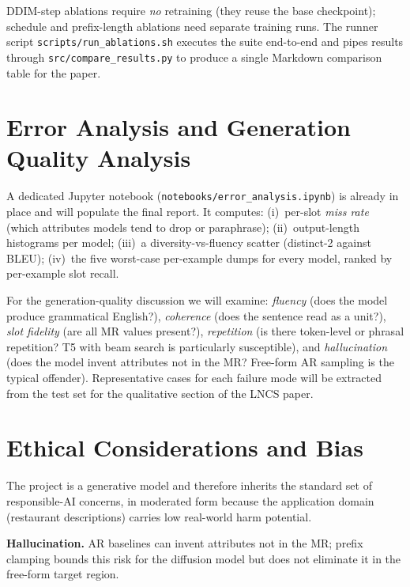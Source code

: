 \documentclass[11pt,a4paper]{article}
\begin{document}
DDIM-step ablations require \emph{no} retraining (they reuse the base
checkpoint); schedule and prefix-length ablations need separate training
runs. The runner script \texttt{scripts/run\_ablations.sh} executes the suite
end-to-end and pipes results through \texttt{src/compare\_results.py} to
produce a single Markdown comparison table for the paper.

\section{Error Analysis and Generation Quality Analysis}

A dedicated Jupyter notebook (\texttt{notebooks/error\_analysis.ipynb}) is
already in place and will populate the final report. It computes:
(i)~per-slot \emph{miss rate} (which attributes models tend to drop or
paraphrase); (ii)~output-length histograms per model; (iii)~a
diversity-vs-fluency scatter (distinct-2 against BLEU); (iv)~the five
worst-case per-example dumps for every model, ranked by per-example slot
recall.

For the generation-quality discussion we will examine: \emph{fluency} (does
the model produce grammatical English?), \emph{coherence} (does the
sentence read as a unit?), \emph{slot fidelity} (are all MR values
present?), \emph{repetition} (is there token-level or phrasal repetition?
T5 with beam search is particularly susceptible), and \emph{hallucination}
(does the model invent attributes not in the MR? Free-form AR sampling is
the typical offender). Representative cases for each failure mode will be
extracted from the test set for the qualitative section of the LNCS paper.

\section{Ethical Considerations and Bias}

The project is a generative model and therefore inherits the standard set of
responsible-AI concerns, in moderated form because the application domain
(restaurant descriptions) carries low real-world harm potential.

\textbf{Hallucination.} AR baselines can invent attributes not in the MR;
prefix clamping bounds this risk for the diffusion model but does not
eliminate it in the free-form target region.
\end{document}
